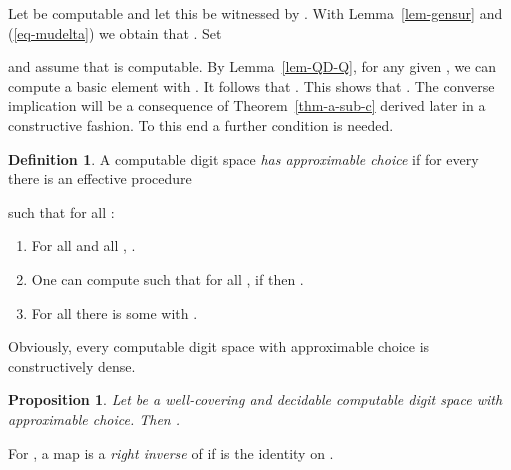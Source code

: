 \documentclass[microtype]{jloganal}
\theoremstyle{plain}
\newtheorem{proposition}[theorem]{Proposition}
\theoremstyle{definition}
\newtheorem{definition}[theorem]{Definition}
\begin{document}
Let  be computable and let this be witnessed by . With Lemma~\ref{lem-gensur} and (\ref{eq-mudelta}) we obtain that . Set 

and assume that  is computable. By Lemma~\ref{lem-QD-Q}, for any given , we can compute a basic element  with . It follows that . This shows that . The converse implication will be a consequence of Theorem~\ref{thm-a-sub-c} derived later in a constructive fashion. To this end a further condition is needed.

\begin{definition}
\label{def-continvdeff}
A computable digit space  \emph{has approximable choice} if for every
 there is an effective procedure 

such that for all :
\begin{enumerate}

\item\label{def-continvdeff-1} For all  and all , .

\item\label{def-continvdeff-2} One can compute  such that for all ,
if  then 
.

\item\label{def-continvdeff-3} For all  there is some  with 
.
\end{enumerate} 
\end{definition} 

Obviously,  every computable digit space with approximable choice is constructively dense.

\begin{proposition}
\label{prop-eqcomp-tte}
Let  be a well-covering and decidable computable digit space with approximable choice. Then .
\end{proposition}

For , a map  is a \emph{right inverse} of  if  is the identity on .
\end{document}
